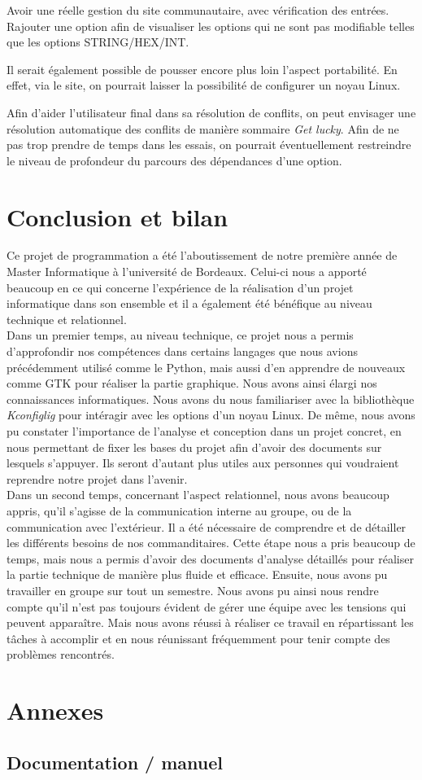 \documentclass[17pts]{report}
\begin{document}
Avoir une réelle gestion du site communautaire, avec vérification des entrées.
Rajouter une option afin de visualiser les options qui ne sont pas modifiable
telles que les options STRING/HEX/INT.

Il serait également possible de pousser encore plus loin l'aspect portabilité.
En effet, via le site, on pourrait laisser la possibilité de configurer un
noyau Linux.

Afin d'aider l'utilisateur final dans sa résolution de conflits, on peut
envisager une résolution automatique des conflits de manière sommaire
\textit{Get lucky}.  Afin de ne pas trop prendre de temps dans les essais, on
pourrait éventuellement restreindre le niveau de profondeur du parcours des
dépendances d'une option.

\chapter{Conclusion et bilan}
\label{cha:Conclusion et bilan}
Ce projet de programmation a été l'aboutissement de notre première année de
Master Informatique à l'université de Bordeaux. Celui-ci nous a apporté
beaucoup en ce qui concerne l'expérience de la réalisation d'un projet
informatique dans son ensemble et il a également été bénéfique au niveau
technique et relationnel.\\

Dans un premier temps, au niveau technique, ce projet nous a permis
d'approfondir nos compétences dans certains langages que nous avions
précédemment utilisé comme le Python, mais aussi d'en apprendre de nouveaux
comme GTK pour réaliser la partie graphique. Nous avons ainsi élargi nos
connaissances informatiques. Nous avons du nous familiariser avec la
bibliothèque \textit{Kconfiglig} pour intéragir avec les options d'un noyau
Linux. De même, nous avons pu constater l'importance de l'analyse et conception
dans un projet concret, en nous permettant de fixer les bases du projet afin
d'avoir des documents sur lesquels s'appuyer. Ils seront d'autant plus utiles
aux personnes qui voudraient reprendre notre projet dans l'avenir.\\

Dans un second temps, concernant l'aspect relationnel, nous avons beaucoup
appris, qu'il s'agisse de la communication interne au groupe, ou de la
communication avec l'extérieur. Il a été nécessaire de comprendre et de
détailler les différents besoins de nos commanditaires. Cette étape nous a pris
beaucoup de temps, mais nous a permis d'avoir des documents d'analyse détaillés
pour réaliser la partie technique de manière plus fluide et efficace.  Ensuite,
nous avons pu travailler en groupe sur tout un semestre. Nous avons pu ainsi
nous rendre compte qu'il n'est pas toujours évident de gérer une équipe avec
les tensions qui peuvent apparaître. Mais nous avons réussi à réaliser ce
travail en répartissant les tâches à accomplir et en nous réunissant
fréquemment pour tenir compte des problèmes rencontrés.\\


\chapter{Annexes}
\label{cha:Annexes}
\section{Documentation / manuel}
\label{sec:Documentation / manuel}


\end{document}
